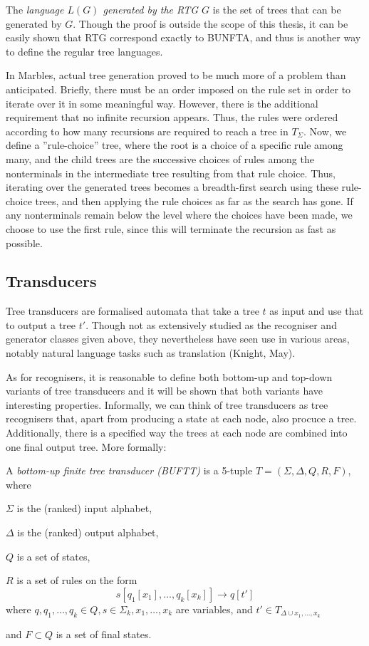 The \emph{language $L(G)$ generated by the RTG $G$} is the set of trees
that can be generated by $G$. Though the proof is outside the scope of this
thesis, it can be easily shown that RTG correspond exactly to BUNFTA, and
thus is another way to define the regular tree languages.

In Marbles, actual tree generation proved to be much more of a problem than
anticipated. Briefly, there must be an order imposed on the rule set in
order to iterate over it in some meaningful way. However, there is the
additional requirement that no infinite recursion appears. Thus, the rules
were ordered according to how many recursions are required to reach a tree
in $T_\Sigma$. Now, we define a ''rule-choice'' tree, where the root is a
choice of a specific rule among many, and the child trees are the
successive choices of rules among the nonterminals in the intermediate tree
resulting from that rule choice. Thus, iterating over the generated trees
becomes a breadth-first search using these rule-choice trees, and then
applying the rule choices as far as the search has gone. If any
nonterminals remain below the level where the choices have been made, we
choose to use the first rule, since this will terminate the recursion as
fast as possible.


\subsection{Transducers}
\label{ssec_transducerdef}

Tree transducers are formalised automata that take a tree $t$ as input and
use that to output a tree $t'$. Though not as extensively studied as the
recogniser and generator classes given above, they nevertheless have seen
use in various areas, notably natural language tasks such as translation
(Knight, May). %

As for recognisers, it is reasonable to define both bottom-up and top-down
variants of tree transducers and it will be shown that both variants have
interesting properties. Informally, we can think of tree transducers as
tree recognisers that, apart from producing a state at each node, also
procuce a tree. Additionally, there is a specified way the trees at each
node are combined into one final output tree. More formally:

A \emph{bottom-up finite tree transducer (BUFTT)} is a 5-tuple $T = (\Sigma,
\Delta, Q, R, F)$, where
\begin{compactitem}
\item $\Sigma$ is the (ranked) input alphabet,
\item $\Delta$ is the (ranked) output alphabet,
\item $Q$ is a set of states,
\item $R$ is a set of rules on the form
$$s[q_1[x_1],\ldots,q_k[x_k]] \rightarrow q[t']$$ where 
$q,q_1,\ldots,q_k \in Q, s \in \Sigma_k, x_1,\ldots,x_k$ are variables, and
$t' \in T_{\Delta \cup {x_1,\ldots,x_k}}$
\item and $F \subset Q$ is a set of final states.
\end{compactitem}


